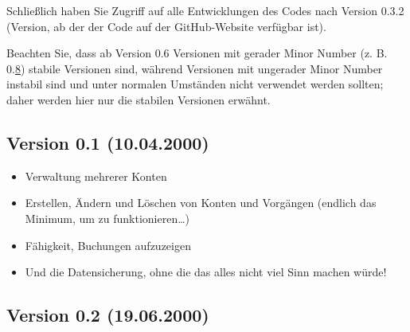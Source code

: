 Schließlich haben Sie Zugriff auf alle Entwicklungen des Codes nach Version 0.3.2 (Version, ab der der Code auf der \gls{GitHub}-Website verfügbar ist).

Beachten Sie, dass ab Version 0.6 Versionen mit gerader Minor Number (z. B. 0.\underline8) stabile Versionen sind, während Versionen mit ungerader Minor Number instabil sind und unter normalen Umständen nicht verwendet werden sollten; daher werden hier nur die stabilen Versionen erwähnt.

\newpage

\subsection{Version 0.1 \textnormal{(10.04.2000)}}

\begin{itemize}
	\item Verwaltung mehrerer Konten%
	\item Erstellen, Ändern und Löschen von Konten und Vorgängen (endlich das Minimum, um zu funktionieren\dots{})%
	\item Fähigkeit, Buchungen aufzuzeigen%
	\item Und die Datensicherung, ohne die das alles nicht viel Sinn machen würde!%
\end{itemize}

\subsection{Version 0.2 \textnormal{(19.06.2000)}}

